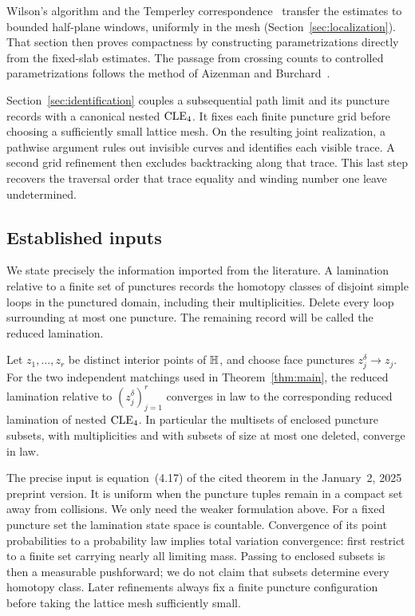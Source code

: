 Wilson's algorithm and the Temperley correspondence~\cite{Wilson,PW,KPW}
transfer the estimates
to bounded half-plane windows, uniformly in the mesh
(Section~\ref{sec:localization}). That section then proves compactness by
constructing parametrizations directly from the fixed-slab estimates.
The passage from crossing counts to controlled parametrizations follows
the method of Aizenman and Burchard~\cite[Lemma~2.4 and Section~4]{AB}.

Section~\ref{sec:identification} couples a subsequential path limit and
its puncture records with a canonical nested \(\mathrm{CLE}_4\). It fixes each
finite puncture grid before choosing a sufficiently small lattice mesh.
On the resulting joint realization, a pathwise argument rules out
invisible curves and identifies each visible trace. A second grid
refinement then excludes backtracking along that trace. This last step
recovers the traversal order that trace equality and winding number one
leave undetermined.

\subsection{Established inputs}\label{sec:inputs}
We state precisely the information imported from the literature. A
lamination relative to a finite set of punctures records the homotopy
classes of disjoint simple loops in the punctured domain, including their
multiplicities. Delete every loop surrounding at most one puncture.
The remaining record will be called the reduced lamination.

\begin{theorem}
\label{thm:cylindrical}
Let \(z_1,\ldots,z_r\) be distinct interior points of \(\mathbb H\), and choose
face punctures \(z_j^\delta\to z_j\). For the two independent matchings
used in Theorem~\ref{thm:main}, the reduced lamination relative to
\((z_j^\delta)_{j=1}^r\) converges in law to the corresponding reduced
lamination of nested \(\mathrm{CLE}_4\). In particular the multisets of enclosed
puncture subsets, with multiplicities and with subsets of size at most
one deleted, converge in law.
\end{theorem}

The precise input is equation~(4.17) of the cited theorem in the
January~2, 2025 preprint version. It is uniform when the puncture tuples remain in a compact
set away from collisions. We only need the weaker formulation above.
For a fixed puncture set the lamination state space is countable.
Convergence of its point probabilities to a probability law implies total
variation convergence: first restrict to a finite set carrying nearly all
limiting mass. Passing to enclosed subsets is then a measurable
pushforward; we do not claim that subsets determine every homotopy class.
Later refinements always fix a finite puncture configuration before taking
the lattice mesh sufficiently small.

